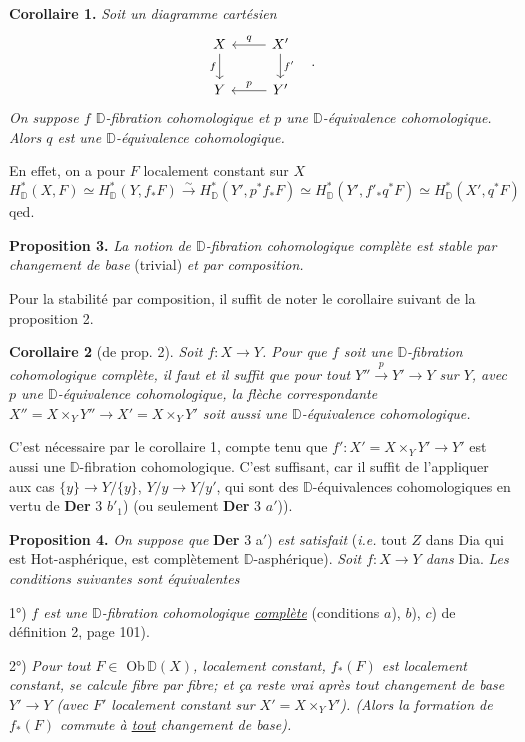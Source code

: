 \documentclass[11pt]{article}
\newcommand{\printedpage}[1]{\marginpar{\footnotesize p.~#1}}
\newcommand{\msp}[1]{\marginpar{\footnotesize [#1]}}
\newcommand{\Hot}{\textsf{Hot}}
\newcommand{\Dia}{\textsf{Dia}}
\newcommand{\Ob}{\textsf{Ob}}
\newcommand{\DD}{\mathbb{D}}
\begin{document}
\textbf{Corollaire 1.} \textit{Soit un diagramme cartésien}
\[
\begin{tikzcd}
X & X' \arrow[l, "q"'] \arrow[d, "f'"] \\
Y & Y' \arrow[l, "p"']
\arrow[from=1-1, to=2-1, "f"']
\end{tikzcd}
\quad .
\]
\textit{On suppose $f$ $\DD$-fibration cohomologique et $p$ une $\DD$-équivalence cohomologique. Alors $q$ est une $\DD$-équivalence cohomologique.}

\msp{page 103}
En effet, on a pour $F$ localement constant sur $X$
\[
H^*_{\DD}(X,F) \simeq H^*_{\DD}(Y, f_*F) \overset{\sim}{\longrightarrow} H^*_{\DD}(Y', p^*f_*F) \simeq H^*_{\DD}(Y', f'_*q^*F) \simeq H^*_{\DD}(X', q^*F)
\]
qed.

\textbf{Proposition 3.} \textit{La notion de $\DD$-fibration cohomologique complète est stable par changement de base} (trivial) \textit{et par composition.}

Pour la stabilité par composition, il suffit de noter le corollaire suivant de la proposition 2.

\textbf{Corollaire 2} (de prop. 2). \textit{Soit $f : X \to Y$. Pour que $f$ soit une $\DD$-fibration cohomologique complète, il faut et il suffit que pour tout $Y'' \overset{p}{\to} Y' \to Y$ sur $Y$, avec $p$ une $\DD$-équivalence cohomologique, la flèche correspondante $X'' = X \times_Y Y'' \longrightarrow X' = X \times_Y Y'$ soit aussi une $\DD$-équivalence cohomologique.}

C’est nécessaire par le corollaire 1, compte tenu que $f' : X' = X \times_Y Y' \to Y'$ est aussi une $\DD$-fibration cohomologique. C’est suffisant, car il suffit de l’appliquer aux cas $\{y\} \to Y/\{y\}$, $Y/y \to Y/y'$, qui sont des $\DD$-équivalences cohomologiques en
\msp{page 104}
vertu de \textbf{Der} 3 $b'_1$) (ou seulement \textbf{Der} 3 $a'$)).

\printedpage{63}

\textbf{Proposition 4.} \textit{On suppose que} \textbf{Der} 3 a$'$) \textit{est satisfait} (\textit{i.e.} tout $Z$ dans \Dia{} qui est \Hot-asphérique, est complètement $\DD$-asphérique). \textit{Soit $f : X \to Y$ dans} \Dia. \textit{Les conditions suivantes sont équivalentes}

1°) \textit{$f$ est une $\DD$-fibration cohomologique \underline{complète}} (conditions $a$), $b$), $c$) de définition 2, page 101).

2°) \textit{Pour tout $F \in$} \Ob\,$\DD(X)$\textit{, localement constant, $f_*(F)$ est localement constant, se calcule fibre par fibre; et ça reste vrai après tout changement de base $Y' \to Y$ (avec $F'$ localement constant sur $X' = X \times_Y Y'$). (Alors la formation de $f_*(F)$ commute à \underline{tout} changement de base).}
\end{document}
